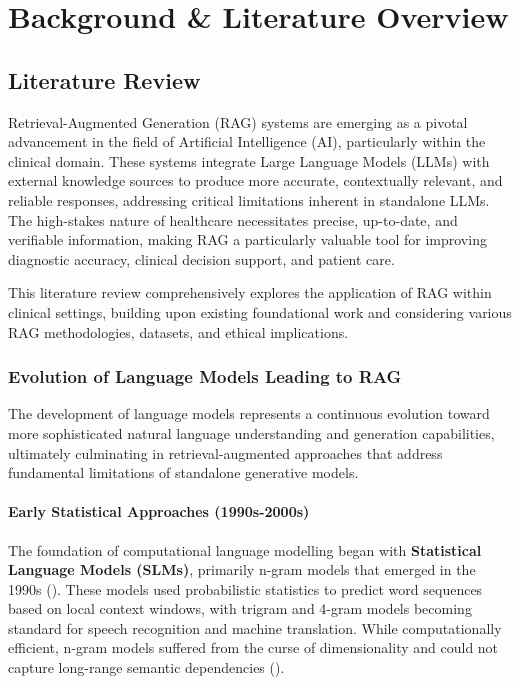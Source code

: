 \chapter{Background \& Literature Overview}
\section{Literature Review}

Retrieval-Augmented Generation (RAG) systems are emerging as a pivotal advancement in the field of Artificial Intelligence (AI), particularly within the clinical domain. These systems integrate Large Language Models (LLMs) with external knowledge sources to produce more accurate, contextually relevant, and reliable responses, addressing critical limitations inherent in standalone LLMs. The high-stakes nature of healthcare necessitates precise, up-to-date, and verifiable information, making RAG a particularly valuable tool for improving diagnostic accuracy, clinical decision support, and patient care.

This literature review comprehensively explores the application of RAG within clinical settings, building upon existing foundational work and considering various RAG methodologies, datasets, and ethical implications.

\subsection{Evolution of Language Models Leading to RAG}

The development of language models represents a continuous evolution toward more sophisticated natural language understanding and generation capabilities, ultimately culminating in retrieval-augmented approaches that address fundamental limitations of standalone generative models.

\subsubsection{Early Statistical Approaches (1990s-2000s)}
The foundation of computational language modelling began with \textbf{Statistical Language Models (SLMs)}, primarily n-gram models that emerged in the 1990s (\citep{kneser1995improved}). These models used probabilistic statistics to predict word sequences based on local context windows, with trigram and 4-gram models becoming standard for speech recognition and machine translation. While computationally efficient, n-gram models suffered from the curse of dimensionality and could not capture long-range semantic dependencies (\citep{bengio2003neural}).

